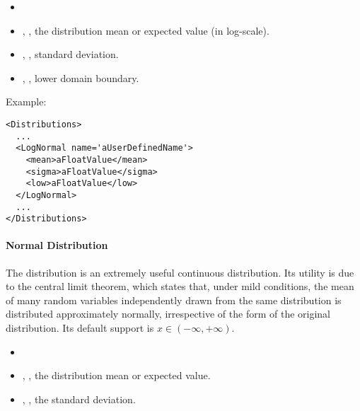 %
\attrIntro
\vspace{-5mm}
\begin{itemize}
  \itemsep0em
  \item \nameDescription
\end{itemize}
\vspace{-5mm}
\subnodesIntro
\begin{itemize}
  \item {}, , the distribution
  mean or expected value (in log-scale).
  \item {}, , standard
  deviation.
  \item {}, , lower domain
  boundary. 
\end{itemize}

Example:
\begin{lstlisting}[style=XML]
<Distributions>
  ...
  <LogNormal name='aUserDefinedName'>
    <mean>aFloatValue</mean>
    <sigma>aFloatValue</sigma>
    <low>aFloatValue</low>
  </LogNormal>
  ...
</Distributions>
\end{lstlisting}

\paragraph{Normal Distribution}
\label{Normal}
The  distribution is an extremely
useful continuous distribution.
%
Its utility is due to the central limit theorem, which states that, under mild
conditions, the mean of many random variables independently drawn from the same
distribution is distributed approximately normally, irrespective of the form of
the original distribution.
%
Its default support is $x \in (-\infty, +\infty)$.

%
\attrIntro
\vspace{-5mm}
\begin{itemize}
  \itemsep0em
  \item \nameDescription
\end{itemize}
\vspace{-5mm}
\subnodesIntro
\begin{itemize}
  \item {}, , the distribution
  mean
  or expected value.
  \item {}, , the standard
  deviation.
\end{itemize}

